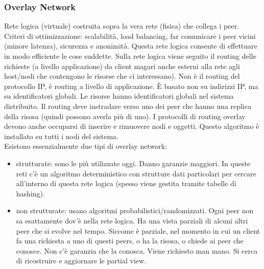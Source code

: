 \subsubsection{Overlay Network}
Rete logica (virtuale) costruita sopra la vera rete (fisica) che collega i peer. \\
Criteri di ottimizzazione: scalabilità, load balancing, far comunicare i peer vicini (minore latenza), sicurezza e anonimità. Questa rete logica consente di effettuare in modo efficiente le cose suddette. 
Sulla rete logica viene seguito il routing delle richieste (a livello applicazione) da client magari anche esterni alla rete agli host/nodi che contengono le risorse che ci interessano). Non è il routing del protocollo IP, è routing a livello di applicazione. È basato non su indirizzi IP, ma su identificatori globali. Le risorse hanno identificatori globali nel sistema distribuito. Il routing deve instradare verso uno dei peer che hanno una replica della risosa (quindi possono averla più di uno). I protocolli di routing overlay devono anche occuparsi di inserire e rimuovere nodi e oggetti. Questo algoritmo è installato su tutti i nodi del sistema. \\
Esistono essenzialmente due tipi di overlay network:
\begin{itemize}
    \item strutturate: sono le più utilizzate oggi. Danno garanzie maggiori. In queste reti c'è un algoritmo deterministico con strutture dati particolari per cercare all'interno di questa rete logica (spesso viene gestita tramite tabelle di hashing).
    \item non strutturate: usano algoritmi probabilistici/randomizzati. Ogni peer non sa esattamente dov'è nella rete logica. Ha una vista parziali di alcuni altri peer che si evolve nel tempo. Siccome è parziale, nel momento in cui un client fa una richiesta a uno di questi peers, o ha la risosa, o chiede ai peer che conosce. Non c'è garanzia che la conosca. Viene richiesto man mano. Si cerca di ricostruire e aggiornare le partial view.
\end{itemize}

